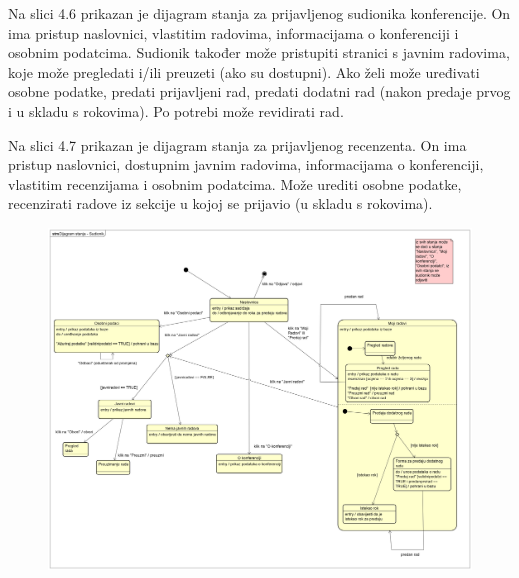 			Na slici 4.6 prikazan je dijagram stanja za prijavljenog sudionika konferencije. On ima pristup naslovnici, vlastitim radovima, informacijama o konferenciji i osobnim podatcima. Sudionik također može pristupiti stranici s javnim radovima, koje može pregledati i/ili preuzeti (ako su dostupni). Ako želi može uređivati osobne podatke, predati prijavljeni rad, predati dodatni rad (nakon predaje prvog i u skladu s rokovima). Po potrebi može revidirati rad.
			
			Na slici 4.7 prikazan je dijagram stanja za prijavljenog recenzenta. On ima pristup naslovnici,
			dostupnim javnim radovima, informacijama o konferenciji, vlastitim recenzijama i osobnim podatcima. Može urediti osobne podatke, recenzirati radove iz sekcije u kojoj se prijavio (u skladu s rokovima).
			
			\begin{figure}[H]
				\includegraphics[width= 15 cm, height= 25 cm, keepaspectratio]{dijagrami/Dijagram stanja - Sudionik.png} 

\end{figure}
